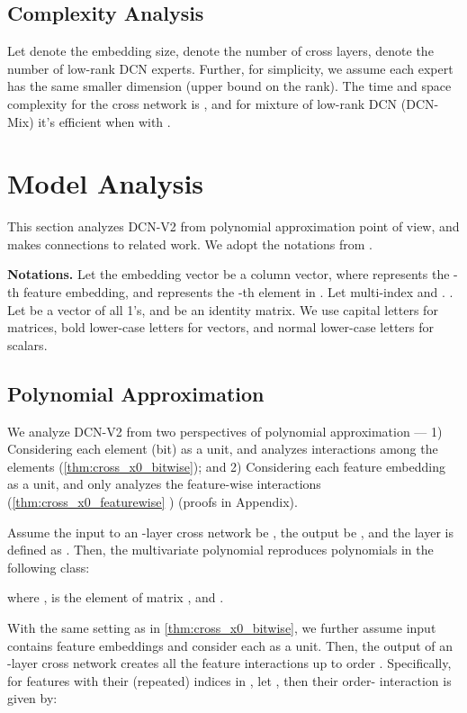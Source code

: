 \documentclass[sigconf]{acmart}
\begin{document}
\subsection{Complexity Analysis}
Let  denote the embedding size,  denote the number of cross layers,  denote the number of low-rank DCN experts. Further, for simplicity, we assume each expert has the same smaller dimension  (upper bound on the rank). 
The time and space complexity for the cross network is , and for mixture of low-rank DCN ({DCN-Mix}) it's efficient when  with . 





\section{Model Analysis}
\label{sec:dcn_analysis}
This section analyzes {DCN-V2} from polynomial approximation point of view, and makes connections to related work. We adopt the notations from \cite{wang2017deep}.

{\bf Notations.} Let the embedding vector  be a column vector, where  represents the -th feature embedding, and  represents the -th element in . Let multi-index  and . . Let  be a vector of all 1's, and  be an identity matrix. We use capital letters for matrices, bold lower-case letters for vectors, and normal lower-case letters for scalars.

\subsection{Polynomial Approximation}
\label{sec:poly_analysis}
We analyze {DCN-V2} from two perspectives of polynomial approximation ---
1) Considering each element (bit)  as a unit, and analyzes interactions among the elements (\autoref{thm:cross_x0_bitwise}); and 2) Considering each feature embedding  as a unit, and only analyzes the feature-wise interactions (\autoref{thm:cross_x0_featurewise} ) (proofs in Appendix). 

\begin{theorem}[Bitwise]
\label{thm:cross_x0_bitwise}
	Assume the input to an -layer cross network be , the output be , and the  layer is defined as . Then, the multivariate polynomial  reproduces polynomials in the following class:
    
    where ,  is the  element of matrix , and .
\end{theorem}



\begin{theorem}
\label{thm:cross_x0_featurewise}
  With the same setting as in \autoref{thm:cross_x0_bitwise}, we further assume input  contains  feature embeddings and consider each  as a unit. Then, the output  of an -layer cross network creates all the feature interactions up to order . Specifically, for features with their (repeated) indices in , let , then their order- interaction is given by:



\end{theorem}
\end{document}
